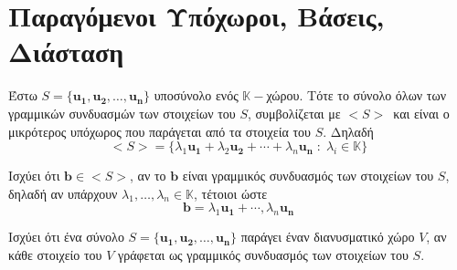 \section*{Παραγόμενοι Υπόχωροι, Βάσεις, Διάσταση}

Έστω $ S = \{ \mathbf{u_{1}}, \mathbf{u_{2}}, \ldots, \mathbf{u_{n}} \} $ 
υποσύνολο ενός $ \mathbb{K}- $χώρου. Τότε το σύνολο \textcolor{Col1}{όλων} 
των γραμμικών συνδυασμών των στοιχείων του $S$, συμβολίζεται με $ < S >  $ και 
είναι ο \textcolor{Col1}{μικρότερος} υπόχωρος που παράγεται από τα στοιχεία του $S$. 
Δηλαδή 
\[
  < S > = \{ \lambda _{1} \mathbf{u_{1}} + \lambda _{2} \mathbf{u_{2}} + \cdots + 
  \lambda _{n} \mathbf{u_{n}} \; : \; \lambda _{i} \in \mathbb{K} \}   
\] 

\begin{myitemize}[leftmargin=*]
  \item Ισχύει ότι $ \mathbf{b} \in < S > $, αν το $ \mathbf{b} $ είναι 
    γραμμικός συνδυασμός των στοιχείων του $S$, δηλαδή αν υπάρχουν 
    $ \lambda _{1}, \ldots, \lambda _{n} \in \mathbb{K} $, τέτοιοι ώστε 
    \[ 
      \mathbf{b} = \lambda _{1} \mathbf{u_{1}} + \cdots, 
      \lambda _{n} \mathbf{u_{n}} 
    \]
  \item Ισχύει ότι ένα σύνολο $ S = \{ \mathbf{u_{1}}, \mathbf{u_{2}}, 
    \ldots, \mathbf{u_{n}} \} $ \textcolor{Col1}{παράγει} έναν διανυσματικό χώρο $V$, 
    αν \textcolor{Col1}{κάθε} στοιχείο του $V$ γράφεται ως γραμμικός συνδυασμός 
    των στοιχείων του $S$. 
\end{myitemize}



